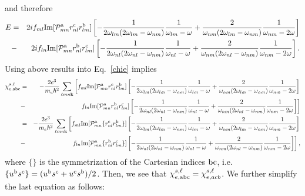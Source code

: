and therefore
\begin{eqnarray}\label{pfen}  
E&=&  
2if_{ml}\mathrm{Im}[{\cal P}^{\mathrm{a}}_{mn}r^{\mathrm{c}}_{nl}r^{\mathrm{b}}_{lm}] 
\left[
-\frac{1}{2\omega_{lm}(2\omega_{lm}-\omega_{nm})}\frac{1}{\omega_{lm}-\omega}
+\frac{2}{\omega_{nm}(2\omega_{lm}-\omega_{nm})}\frac{1}{\omega_{nm}-2\omega}
\right]
\nonumber\\
&-& 
2if_{ln}\mathrm{Im}[{\cal P}^{\mathrm{a}}_{mn}r^{\mathrm{b}}_{nl}r^{\mathrm{c}}_{lm}]
\left[
-\frac{1}{2\omega_{nl}(2\omega_{nl}-\omega_{nm})}\frac{1}{\omega_{nl}-\omega}
+\frac{2}{\omega_{nm}(2\omega_{nl}-\omega_{nm})}\frac{1}{\omega_{nm}-2\omega}
\right]
.
\end{eqnarray}  
Using above results into Eq.~\eqref{chie} implies
\begin{eqnarray}\label{pfen3} 
\chi_{e,\mathrm{a}\mathrm{b}\mathrm{c}}^{s,\ell}
&=& 
-\frac{2e^3}{m_e\hbar^2} 
\sum_{\ell m n\mathbf{k}}
\left[ 
f_{ml}\mathrm{Im}[{\cal P}^{\mathrm{a}}_{mn}r^{\mathrm{c}}_{nl}r^{\mathrm{b}}_{lm}] 
\left[
-\frac{1}{2\omega_{lm}(2\omega_{lm}-\omega_{nm})}\frac{1}{\omega_{lm}-\omega}
+\frac{2}{\omega_{nm}(2\omega_{lm}-\omega_{nm})}\frac{1}{\omega_{nm}-2\omega}
\right]
\right.
\nonumber\\
&-&
\left. 
f_{ln}\mathrm{Im}[{\cal P}^{\mathrm{a}}_{mn}r^{\mathrm{b}}_{nl}r^{\mathrm{c}}_{lm}]
\left[
-\frac{1}{2\omega_{nl}(2\omega_{nl}-\omega_{nm})}\frac{1}{\omega_{nl}-\omega}
+\frac{2}{\omega_{nm}(2\omega_{nl}-\omega_{nm})}\frac{1}{\omega_{nm}-2\omega}
\right]
\right]
\nonumber\\
&=& 
-\frac{2e^3}{m_e\hbar^2} 
\sum_{\ell m n\mathbf{k}}
\left[ 
f_{ml}\mathrm{Im}[{\cal P}^{\mathrm{a}}_{mn}\{r^{\mathrm{c}}_{nl}r^{\mathrm{b}}_{lm}\}] 
\left[
-\frac{1}{2\omega_{lm}(2\omega_{lm}-\omega_{nm})}\frac{1}{\omega_{lm}-\omega}
+\frac{2}{\omega_{nm}(2\omega_{lm}-\omega_{nm})}\frac{1}{\omega_{nm}-2\omega}
\right]
\right.
\nonumber\\
&-&
\left. 
f_{ln}\mathrm{Im}[{\cal P}^{\mathrm{a}}_{mn}\{r^{\mathrm{b}}_{nl}r^{\mathrm{c}}_{lm}\}]
\left[
-\frac{1}{2\omega_{nl}(2\omega_{nl}-\omega_{nm})}\frac{1}{\omega_{nl}-\omega}
+\frac{2}{\omega_{nm}(2\omega_{nl}-\omega_{nm})}\frac{1}{\omega_{nm}-2\omega}
\right]
\right]
,
\end{eqnarray}  
where $\{\}$ is the symmetrization of the Cartesian indices $\mathrm{b}\mathrm{c}$, i.e. 
$\{u^{\mathrm{b}}s^{\mathrm{c}}\}=(u^{\mathrm{b}}s^{\mathrm{c}}+u^{\mathrm{c}}s^{\mathrm{b}})/2$. 
Then, we see that
$\chi_{e,\mathrm{a}\mathrm{b}\mathrm{c}}^{s,\ell}=\chi_{e,acb}^{s,\ell}$. We further simplify 
the last equation as follows:
